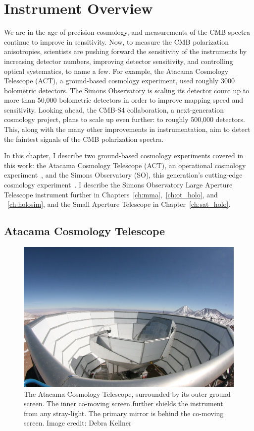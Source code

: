 \chapter{Instrument Overview}
\label{ch:instruments}

We are in the age of precision cosmology, and measurements of the CMB spectra continue to improve in sensitivity.  Now, to measure the CMB polarization anisotropies, scientists are pushing forward the sensitivity of the instruments by increasing detector numbers, improving detector sensitivity, and controlling optical systematics, to name a few.  For example, the Atacama Cosmology Telescope (ACT), a ground-based cosmology experiment, used roughly 3000 bolometric detectors.  The Simons Observatory is scaling its detector count up to more than 50,000 bolometric detectors in order to improve mapping speed and sensitivity.  Looking ahead, the CMB-S4 collaboration, a next-generation cosmology project, plans to scale up even further: to roughly 500,000 detectors.  This, along with the many other improvements in instrumentation, aim to detect the faintest signals of the CMB polarization spectra.

In this chapter, I describe two ground-based cosmology experiments covered in this work: the Atacama Cosmology Telescope (ACT), an operational cosmology experiment~\cite{act_inst}, and the Simons Observatory (SO), this generation's cutting-edge cosmology experiment~\cite{so19}.  I describe the Simons Observatory Large Aperture Telescope instrument further in Chapters~\ref{ch:mma},~\ref{ch:ot_holo}, and ~\ref{ch:holosim}, and the Small Aperture Telescope in Chapter~\ref{ch:sat_holo}.

\section{Atacama Cosmology Telescope}

\begin{figure}[t]
    \centering
    \includegraphics[width = \textwidth]{Figures/act_inst_close.jpeg}
    \caption{The Atacama Cosmology Telescope, surrounded by its outer ground screen. The inner co-moving screen further shields the instrument from any stray-light.  The primary mirror is behind the co-moving screen.  Image credit: Debra Kellner}
    \label{fig:act_site}
\end{figure}

